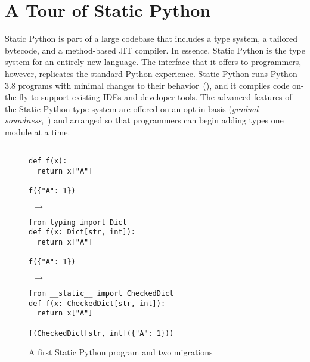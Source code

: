\documentclass[english,cleveref,crc]{programming}
\newcommand{\SP}{Static Python}
\begin{document}
\section{A Tour of \SP{}}
\label{s:tour}


\SP{} is part of a large codebase that includes a type system, a tailored
bytecode, and a method-based JIT compiler.
In essence, \SP{} is the type system for an entirely new language.
The interface that it offers to programmers, however, replicates the
standard Python experience.
\SP{} runs Python 3.8 programs with minimal changes to their
behavior~(),
and it compiles code on-the-fly to support existing
IDEs and developer tools.
The advanced features of the \SP{} type system are offered on an opt-in basis
(\emph{gradual soundness},~)
and arranged so that programmers can begin adding types one module at a time.

\begin{figure}
  \begin{minipage}{0.15\columnwidth}\noindent\begin{lstlisting}

def f(x):
  return x["A"]

f({"A": 1})
  \end{lstlisting}
\end{minipage}\begin{minipage}{0.07\columnwidth}\(~~\rightarrow\!\!\!\!\)\end{minipage}\begin{minipage}{0.32\columnwidth}\noindent\begin{lstlisting}
from typing import Dict
def f(x: Dict[str, int]):
  return x["A"]

f({"A": 1})
  \end{lstlisting}
  \end{minipage}\begin{minipage}{0.07\columnwidth}\(~~\rightarrow\!\!\!\!\)\end{minipage}\begin{minipage}{0.38\columnwidth}\noindent\begin{lstlisting}
from __static__ import CheckedDict
def f(x: CheckedDict[str, int]):
  return x["A"]

f(CheckedDict[str, int]({"A": 1}))
  \end{lstlisting}
  \end{minipage}


  \caption{A first \SP{} program and two migrations}
  \label{fig:sp-example}
\end{figure}
\end{document}

